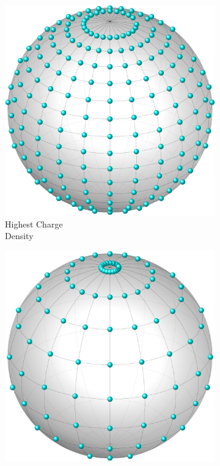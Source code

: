 \documentclass[10pt,letterpaper]{article}
\begin{document}
\begin{figure}[h!]%
	\centering
	\begin{subfigure}[b]{0.3\textwidth}
		\centering
		\includegraphics[scale=0.2]{latticeDense.pdf}
		\caption{Highest Charge \\Density}
		\label{fig:gull}
	\end{subfigure}
	\begin{subfigure}[b]{0.3\textwidth}
		\centering
		\includegraphics[scale=0.2]{latticeMid.pdf}

\end{subfigure}
\end{figure}
\end{document}

